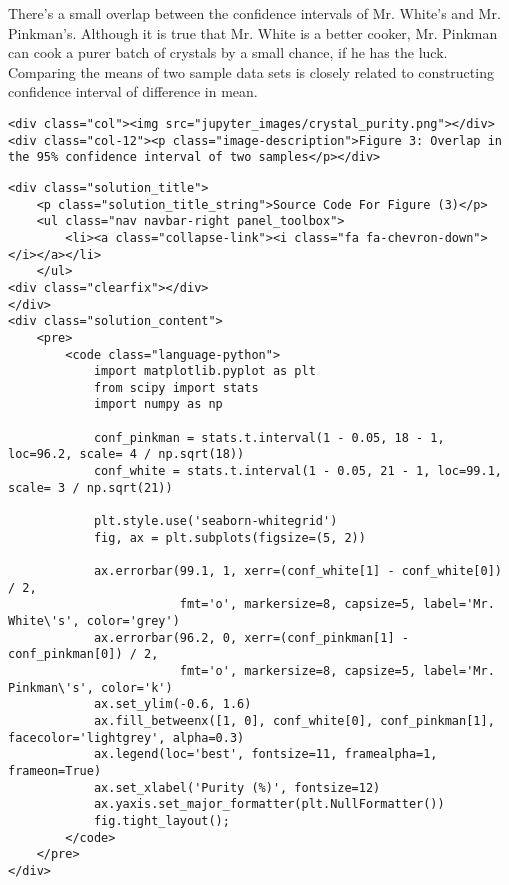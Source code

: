 \documentclass[11pt]{article}
\begin{document}
    There's a small overlap between the confidence intervals of Mr. White's
and Mr. Pinkman's. Although it is true that Mr. White is a better
cooker, Mr. Pinkman can cook a purer batch of crystals by a small
chance, if he has the luck. Comparing the means of two sample data sets
is closely related to constructing confidence interval of difference in
mean.

\hypertarget{fig2}{}
\begin{verbatim}
<div class="col"><img src="jupyter_images/crystal_purity.png"></div>
<div class="col-12"><p class="image-description">Figure 3: Overlap in the 95% confidence interval of two samples</p></div>
\end{verbatim}

    \begin{verbatim}
<div class="solution_title">
    <p class="solution_title_string">Source Code For Figure (3)</p>
    <ul class="nav navbar-right panel_toolbox">
        <li><a class="collapse-link"><i class="fa fa-chevron-down"></i></a></li>
    </ul>
<div class="clearfix"></div>
</div>
<div class="solution_content">
    <pre>
        <code class="language-python">
            import matplotlib.pyplot as plt
            from scipy import stats
            import numpy as np

            conf_pinkman = stats.t.interval(1 - 0.05, 18 - 1, loc=96.2, scale= 4 / np.sqrt(18))
            conf_white = stats.t.interval(1 - 0.05, 21 - 1, loc=99.1, scale= 3 / np.sqrt(21))

            plt.style.use('seaborn-whitegrid')
            fig, ax = plt.subplots(figsize=(5, 2))

            ax.errorbar(99.1, 1, xerr=(conf_white[1] - conf_white[0]) / 2, 
                        fmt='o', markersize=8, capsize=5, label='Mr. White\'s', color='grey')
            ax.errorbar(96.2, 0, xerr=(conf_pinkman[1] - conf_pinkman[0]) / 2, 
                        fmt='o', markersize=8, capsize=5, label='Mr. Pinkman\'s', color='k')
            ax.set_ylim(-0.6, 1.6)
            ax.fill_betweenx([1, 0], conf_white[0], conf_pinkman[1], facecolor='lightgrey', alpha=0.3)
            ax.legend(loc='best', fontsize=11, framealpha=1, frameon=True)
            ax.set_xlabel('Purity (%)', fontsize=12)
            ax.yaxis.set_major_formatter(plt.NullFormatter())
            fig.tight_layout();
        </code>
    </pre>
</div>
\end{verbatim}

    \hypertarget{quick-highlights}{}
\end{document}
